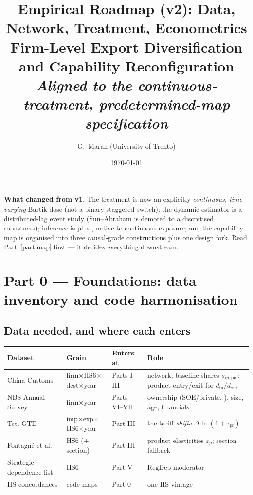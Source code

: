 \documentclass[11pt]{article}
\title{\textbf{Empirical Roadmap (v2): Data, Network, Treatment, Econometrics}\\[2pt]
\large Firm-Level Export Diversification and Capability Reconfiguration\\[2pt]
\normalsize\itshape Aligned to the continuous-treatment, predetermined-map specification}
\author{G.\ Maran \quad (University of Trento)}
\date{\today}
\newcommand{\din}{d_{\mathrm{in}}}
\newcommand{\dout}{d_{\mathrm{out}}}
\begin{document}
\maketitle

\noindent\textbf{What changed from v1.} The treatment is now an explicitly
\emph{continuous, time-varying} Bartik dose (not a binary staggered switch); the
dynamic estimator is a distributed-lag event study (Sun--Abraham is demoted to a
discretised robustness); inference is \citet{adao2019} plus
\citet{borusyakhull2022}, native to continuous exposure; and the capability map is
organised into three causal-grade constructions plus one design fork. Read
Part~\ref{part:map} first --- it decides everything downstream.

\tableofcontents

\section{Part 0 --- Foundations: data inventory and code harmonisation}
\label{part:data}

\subsection{Data needed, and where each enters}
\begin{center}\small
\begin{tabular}{@{}p{3.0cm}p{3.2cm}p{2.4cm}p{4.7cm}@{}}
\toprule
\textbf{Dataset} & \textbf{Grain} & \textbf{Enters at} & \textbf{Role} \\
\midrule
China Customs & firm$\times$HS6$\times$dest$\times$year & Parts I--III &
network; baseline shares $s_{ip,\mathrm{pre}}$; product entry/exit for $\din/\dout$ \\
NBS Annual Survey & firm$\times$year & Parts VI--VII &
ownership (SOE/private, \citealp{guariglia2011}), size, age, financials \\
Teti GTD \citep{teti2024} & imp$\times$exp$\times$HS6$\times$year & Part III &
the tariff \emph{shifts} $\Delta\ln(1+\tau_{pt})$ \\
Fontagn\'e et al.\ \citeyearpar{fontagne2022} & HS6 ($+$section) & Part III &
product elasticities $\varepsilon_p$; section fallback \\
Strategic-dependence list & HS6 & Part V &
$\mathrm{RegDep}$ moderator \citep{farrell2019,arjona2023} \\
HS concordances & code maps & Part 0 & one HS vintage \\
\bottomrule
\end{tabular}
\end{center}
\end{document}
